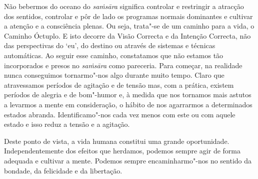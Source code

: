 Não bebermos do oceano do \emph{saṁsāra} significa controlar e restringir a
atracção dos sentidos, controlar e pôr de lado os programas normais dominantes e
cultivar a atenção e a consciência plenas. Ou seja, trata"-se de um caminho para
a vida, o Caminho Óctuplo. E isto decorre da Visão Correcta e da Intenção
Correcta, não das perspectivas do `eu', do destino ou através de sistemas e
técnicas automáticas. Ao seguir esse caminho, constatamos que não estamos tão
incorporados e presos no \emph{saṁsāra} como pareceria. Para começar, na
realidade nunca conseguimos tornarmo"-nos algo durante muito tempo. Claro que
atravessamos períodos de agitação e de tensão mas, com a prática, existem
períodos de alegria e de bom"-humor e, à medida que nos tornamos mais astutos a
levarmos a mente em consideração, o hábito de nos agarrarmos a determinados
estados abranda. Identificamo"-nos cada vez menos com este ou com aquele estado e
isso reduz a tensão e a agitação.

Deste ponto de vista, a vida humana constitui uma grande oportunidade.
Independentemente dos efeitos que herdamos, podemos sempre agir de forma
adequada e cultivar a mente. Podemos sempre encaminharmo"-nos no sentido da
bondade, da felicidade e da libertação.
